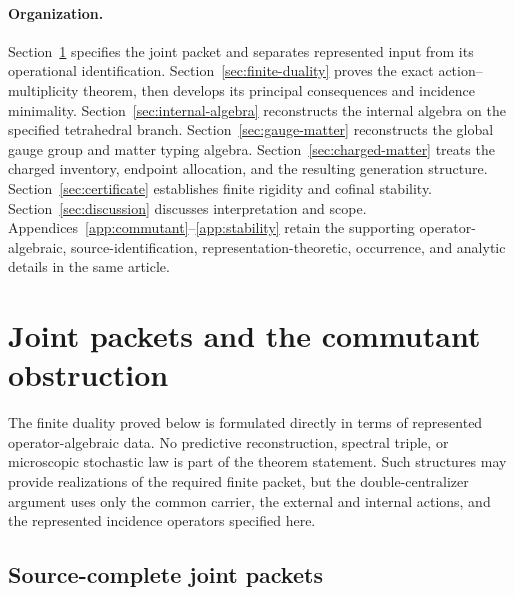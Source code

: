 \documentclass[11pt]{article}
\numberwithin{equation}{section}
\theoremstyle{definition}
\theoremstyle{remark}
\begin{document}
\paragraph{Organization.}
Section~\ref{sec:joint-interface} specifies the joint packet and separates
represented input from its operational identification.
Section~\ref{sec:finite-duality} proves the exact action--multiplicity theorem,
then develops its principal consequences and incidence minimality.
Section~\ref{sec:internal-algebra} reconstructs the internal algebra on the
specified tetrahedral branch.
Section~\ref{sec:gauge-matter} reconstructs the global gauge group and matter
typing algebra.  Section~\ref{sec:charged-matter} treats the charged inventory,
endpoint allocation, and the resulting generation structure.
Section~\ref{sec:certificate} establishes finite rigidity and cofinal stability.
Section~\ref{sec:discussion} discusses interpretation and scope.
Appendices~\ref{app:commutant}--\ref{app:stability} retain the supporting
operator-algebraic, source-identification, representation-theoretic,
occurrence, and analytic details in the same article.


\section{Joint packets and the commutant obstruction}
\label{sec:joint-interface}

The finite duality proved below is formulated directly in terms of represented
operator-algebraic data.  No predictive reconstruction, spectral triple, or
microscopic stochastic law is part of the theorem statement.  Such structures
may provide realizations of the required finite packet, but the
double-centralizer argument uses only the common carrier, the external and
internal actions, and the represented incidence operators specified here.

\subsection{Source-complete joint packets}
\end{document}

